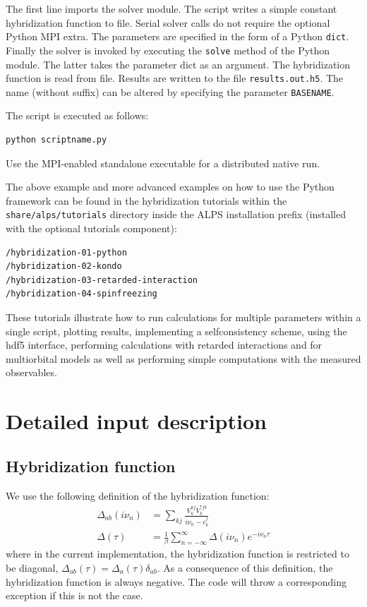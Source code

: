 \documentclass[aps,prb,floatfix,superscriptaddress,twocolumn,notitlepage]{revtex4-1}
\newcommand{\iom}{{\ensuremath{i\nu}}}
\begin{document}
The first line imports the solver module. The script writes a simple constant hybridization function to file. Serial solver calls do not require the optional Python MPI extra.
The parameters are specified in the form of a Python \verb#dict#.
Finally the solver is invoked by executing the \verb#solve# method of the Python module. The latter takes the parameter dict as an argument. The hybridization function is read from file. Results are written to the file \verb#results.out.h5#. The name (without suffix) can be altered by specifying the parameter \verb#BASENAME#.

The script is executed as follows:
\begin{verbatim}
python scriptname.py
\end{verbatim}
Use the MPI-enabled standalone executable for a distributed native run.

The above example and more advanced examples on how to use the Python framework can be found in the hybridization tutorials within the \verb#share/alps/tutorials# directory inside the ALPS installation prefix (installed with the optional tutorials component):
\begin{verbatim}
/hybridization-01-python
/hybridization-02-kondo
/hybridization-03-retarded-interaction
/hybridization-04-spinfreezing
\end{verbatim}

These tutorials illustrate how to run calculations for multiple parameters within a single script, plotting results, implementing a selfconsistency scheme, using the hdf5 interface, performing calculations with retarded interactions and for multiorbital models as well as performing simple computations with the measured observables.

\section{Detailed input description}

\subsection{Hybridization function}
\label{hybridization}
We use the following definition of the hybridization function:
\begin{align}
\Delta_{ab}(\iom_{n}) &= \sum_{kj}\frac{V_{k}^{aj}V_{k}^{*jb}}{\iom_{n}-\epsilon_{k}^{j}}\\
\Delta(\tau) &= \frac{1}{\beta}\sum_{n=-\infty}^{\infty}\Delta(\iom_{n})e^{-\iom_{n}\tau}
\end{align}
where in the current implementation, the hybridization function is restricted to be diagonal, $\Delta_{ab}(\tau)=\Delta_{a}(\tau)\delta_{ab}$.
As a consequence of this definition, the hybridization function is always negative. The code will throw a corresponding exception if this is not the case.
\end{document}
